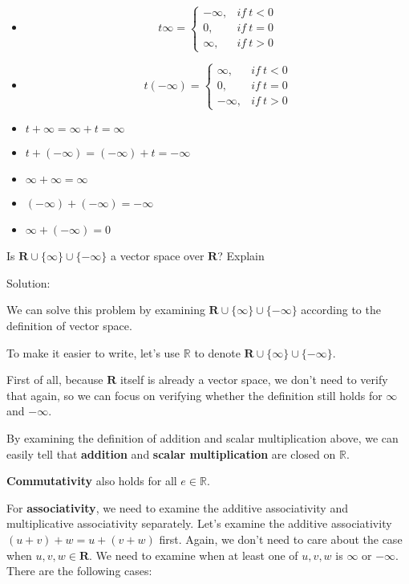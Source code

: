 \documentclass[12pt, letterpaper, oneside]{book}
\begin{document}
\begin{itemize}
  \item
        \[
          t \infty = \begin{cases}
            -\infty, & if \ t < 0 \\
            0,       & if \ t = 0 \\
            \infty,  & if \ t > 0
          \end{cases}
        \]
  \item
        \[
          t (-\infty) = \begin{cases}
            \infty,  & if \ t < 0 \\
            0,       & if \ t = 0 \\
            -\infty, & if \ t > 0
          \end{cases}
        \]
  \item $t + \infty = \infty + t = \infty$
  \item $t + (-\infty) = (-\infty) + t = -\infty$
  \item $\infty + \infty = \infty$
  \item $(-\infty) + (-\infty) = -\infty$
  \item $\infty + (-\infty) = 0$
\end{itemize}

Is $\mathbf{R} \cup \{\infty\} \cup \{-\infty\}$ a vector space over
$\mathbf{R}$? Explain

Solution:

We can solve this problem by examining $\mathbf{R} \cup \{\infty\} \cup
  \{-\infty\}$ according to the definition of vector space.

To make it easier to write, let's use $\mathbb{R}$ to denote $\mathbf{R} \cup
  \{\infty\} \cup \{-\infty\}$.

First of all, because $\mathbf{R}$ itself is already a vector space, we don't
need to verify that again, so we can focus on verifying whether the definition
still holds for $\infty$ and $-\infty$.

By examining the definition of addition and scalar multiplication above, we can
easily tell that \textbf{addition} and \textbf{scalar multiplication} are
closed on $\mathbb{R}$.

\textbf{Commutativity} also holds for all $e \in \mathbb{R}$.

For \textbf{associativity}, we need to examine the additive associativity and
multiplicative associativity separately. Let's examine the additive
associativity $(u + v) + w = u + (v + w)$ first. Again, we don't need to care
about the case when $u, v, w \in \mathbf{R}$. We need to examine when at least
one of $u, v, w$ is $\infty$ or $-\infty$. There are the following cases:
\end{document}
